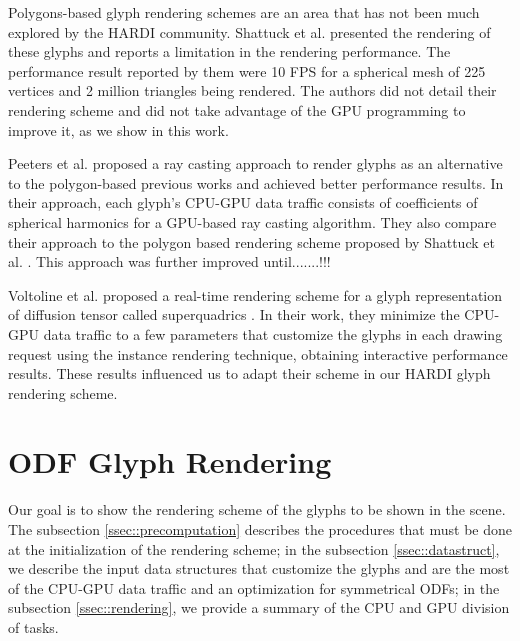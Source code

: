 \documentclass[twoside,twocolumn,10pt]{article}
\begin{document}
Polygons-based glyph rendering schemes are an area that has not been much explored by the HARDI community. Shattuck et al. \cite{shattuck2008} presented the rendering of these glyphs and reports a limitation in the rendering performance. The performance result reported by them were 10 FPS for a spherical mesh of 225 vertices and 2 million triangles being rendered. The authors did not detail their rendering scheme and did not take advantage of the GPU programming to improve it, as we show in this work.



Peeters et al. \cite{peeters2009} proposed a ray casting approach to render glyphs as an alternative to the polygon-based previous works and achieved better performance results. In their approach, each glyph's CPU-GPU data traffic consists of coefficients of spherical harmonics for a GPU-based ray casting algorithm. They also compare their approach to the polygon based rendering scheme proposed by Shattuck et al. \cite{shattuck2008}.  This approach was further improved until.......!!!

Voltoline et al. \cite{voltoline2021} proposed a real-time rendering scheme for a glyph representation of diffusion tensor called superquadrics \cite{Kindlmann2004}. In their work, they minimize the CPU-GPU data traffic to a few parameters that customize the glyphs in each drawing request using the instance rendering technique, obtaining interactive performance results. These results influenced us to adapt their scheme in our HARDI glyph rendering scheme.


\section{ODF Glyph Rendering}
\label{sec::odf_glyph_rendering}

Our goal is to show the rendering scheme of the glyphs to be shown in the scene. The subsection \ref{ssec::precomputation} describes the procedures that must be done at the initialization of the rendering scheme; in the subsection \ref{ssec::datastruct}, we describe the input data structures that customize the glyphs and are the most of the CPU-GPU data traffic and an optimization for symmetrical ODFs; in the subsection \ref{ssec::rendering}, we provide a summary of the CPU and GPU division of tasks.%
\end{document}

